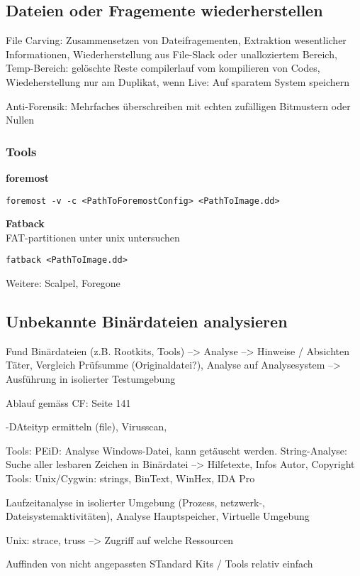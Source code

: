 \subsection{Dateien oder Fragemente wiederherstellen}
File Carving: Zusammensetzen von Dateifragementen, Extraktion wesentlicher Informationen, Wiederherstellung aus File-Slack oder unalloziertem Bereich, 
Temp-Bereich: gelöschte Reste compilerlauf vom kompilieren von Codes, Wiedeherstellung nur am Duplikat, wenn Live: Auf sparatem System speichern

Anti-Forensik: Mehrfaches überschreiben mit echten zufälligen Bitmustern oder Nullen

\subsubsection{Tools}
\textbf{foremost} \\
\begin{verbatim}
foremost -v -c <PathToForemostConfig> <PathToImage.dd>
\end{verbatim}


\textbf{Fatback}\\
FAT-partitionen unter unix untersuchen
\begin{verbatim}
fatback <PathToImage.dd>
\end{verbatim}

Weitere: Scalpel, Foregone

\subsection{Unbekannte Binärdateien analysieren}
Fund Binärdateien (z.B. Rootkits, Tools) --> Analyse --> Hinweise / Absichten Täter, Vergleich Prüfsumme (Originaldatei?), Analyse auf Analysesystem --> Ausführung in isolierter Testumgebung

Ablauf gemäss CF: Seite 141

-DAteityp ermitteln (file), Virusscan, 

Tools: PEiD: Analyse Windows-Datei, kann getäuscht werden.
String-Analyse: Suche aller lesbaren Zeichen in Binärdatei --> Hilfetexte, Infos Autor, Copyright
Tools: Unix/Cygwin: strings, BinText, WinHex, IDA Pro

Laufzeitanalyse in isolierter Umgebung (Prozess, netzwerk-, Dateisystemaktivitäten), Analyse Hauptspeicher, Virtuelle Umgebung

Unix: strace, truss --> Zugriff auf welche Ressourcen

Auffinden von nicht angepassten STandard Kits / Tools relativ einfach

